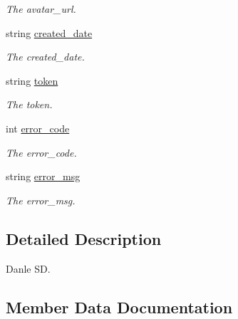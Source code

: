\begin{DoxyCompactItemize}
\begin{DoxyCompactList}\small\item\em The avatar\+\_\+url. \end{DoxyCompactList}\item 
string \mbox{\hyperlink{class_t_net_1_1_sns_1_1_danle_s_d_k_acee920a7aff814e0fb9db6843b7b3234}{created\+\_\+date}}
\begin{DoxyCompactList}\small\item\em The created\+\_\+date. \end{DoxyCompactList}\item 
string \mbox{\hyperlink{class_t_net_1_1_sns_1_1_danle_s_d_k_a140ff64a48ec8750cc5f280a3cb75ca4}{token}}
\begin{DoxyCompactList}\small\item\em The token. \end{DoxyCompactList}\item 
int \mbox{\hyperlink{class_t_net_1_1_sns_1_1_danle_s_d_k_adc70c49808878184c9d22deeb69ae6cc}{error\+\_\+code}}
\begin{DoxyCompactList}\small\item\em The error\+\_\+code. \end{DoxyCompactList}\item 
string \mbox{\hyperlink{class_t_net_1_1_sns_1_1_danle_s_d_k_a0df145b019ffb20005d72d25d6567f70}{error\+\_\+msg}}
\begin{DoxyCompactList}\small\item\em The error\+\_\+msg. \end{DoxyCompactList}\end{DoxyCompactItemize}


\subsection{Detailed Description}
Danle SD. 



\subsection{Member Data Documentation}
\mbox{\label{class_t_net_1_1_sns_1_1_danle_s_d_k_aaca48e752c951729ca4351f3ede9bebc}} 
